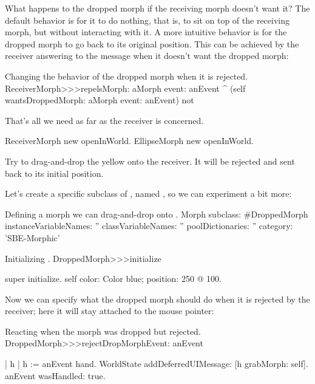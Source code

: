 \documentclass[a4paper,10pt,twoside]{book}
\begin{document}
What happens to the dropped morph if the receiving morph doesn't want it?
The default behavior is for it to do nothing, that is, to sit on top of the receiving morph, but without interacting with it.
A more intuitive behavior is for the dropped morph to go back to its original position.
This can be achieved by the receiver answering  to the message  when it doesn't want the dropped morph:

\begin{method}{Changing the behavior of the dropped morph when it is rejected.}
ReceiverMorph>>>repelsMorph: aMorph event: anEvent
	^ (self wantsDroppedMorph: aMorph event: anEvent) not
\end{method}

That's all we need as far as the receiver is concerned.

\begin{code}{}
ReceiverMorph new openInWorld.
EllipseMorph new openInWorld.
\end{code}
\noindent
Try to drag-and-drop the yellow  onto the receiver.
It will be rejected and sent back to its initial position.


Let's create a specific subclass of , named , so we can experiment a bit more:

\begin{classdef}{Defining a morph we can drag-and-drop onto .}
Morph subclass: #DroppedMorph
	instanceVariableNames: ''
	classVariableNames: ''
	poolDictionaries: ''
	category: 'SBE-Morphic'
\end{classdef}

\begin{method}{Initializing .}
DroppedMorph>>>initialize

	super initialize.
	self
		color: Color blue;
		position: 250 @ 100.
\end{method}

Now we can specify what the dropped morph should do when it is rejected by the receiver; here it will stay attached to the mouse pointer:

\begin{method}{Reacting when the morph was dropped but rejected.}
DroppedMorph>>>rejectDropMorphEvent: anEvent

	| h |
	h := anEvent hand.
	WorldState addDeferredUIMessage: [h grabMorph: self].
	anEvent wasHandled: true.
\end{method}
\end{document}
